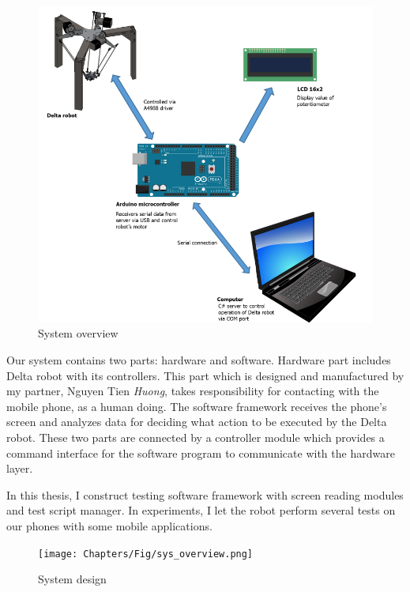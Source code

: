 	\begin{figure}
		\centering
		\includegraphics[scale=0.7]{Chapters/Fig/sys_overview_hw.png}
		\caption{System overview}
		\label{fig:sys_overview_hw}
	\end{figure}

Our system contains two parts: hardware and software.
Hardware part includes Delta robot with its controllers. This part which is designed and manufactured by my partner, Nguyen Tien \textit{Huong}, takes responsibility for contacting with the mobile phone, as a human doing.
The software framework receives the phone's screen and analyzes data for deciding what action to be executed by the Delta robot.
These two parts are connected by a controller module which provides a command interface for the software program to communicate with the hardware layer.

In this thesis, I construct testing software framework with screen reading modules and test script manager. In experiments, I let the robot perform several tests on our phones with some mobile applications.

	\begin{figure}[H]
		\centering
		\texttt{[image: Chapters/Fig/sys\_overview.png]}
		\caption{System design}
		\label{fig:sys_overview}
	\end{figure}

